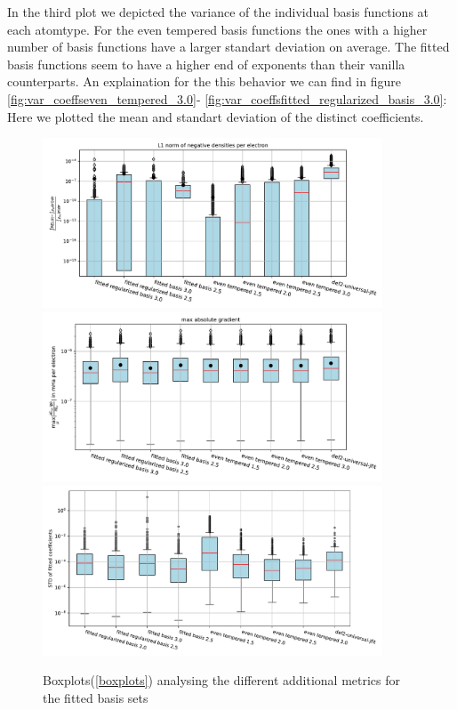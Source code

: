In the third plot we depicted the variance of the individual basis functions at each atomtype. For the even tempered basis functions the ones with a higher number of basis functions have a larger standart deviation on average. The fitted basis functions seem
 to have a higher end of exponents than their vanilla counterparts. An explaination for the this behavior we can find in figure \ref{fig:var_coeffseven_tempered_3.0}- \ref{fig:var_coeffsfitted_regularized_basis_3.0}: Here we plotted the mean and standart deviation of the distinct coefficients.
    \begin{figure}
    \centering
    \includegraphics[width=0.9\textwidth]{chapters/results/results_images/L1_negative_densities_on_hartree+external_MOFDFT_for_different_basis_sets}
    \includegraphics[width=0.9\textwidth]{chapters/results/results_images/max_abs_gradient_on_hartree+external_MOFDFT_for_different_basis_sets}
    \includegraphics[width=0.9\textwidth]{chapters/results/results_images/var_basis_sets}
    \caption{Boxplots(\ref{boxplots}) analysing the different additional metrics for the fitted basis sets}
\end{figure}


